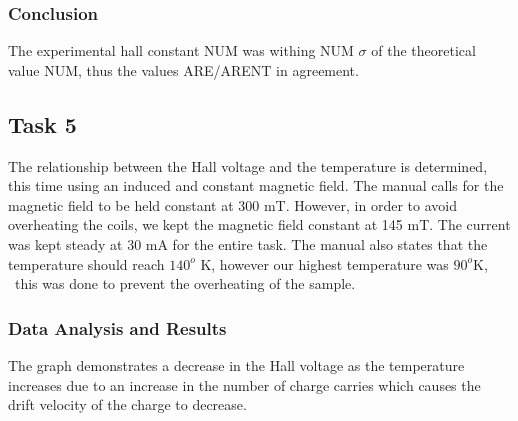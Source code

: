 \documentclass[a4paper]{article}
\begin{document}
\begin{figure}[H]
\centering
\label{task24plot}
\end{figure}








\subsubsection{Conclusion}
\qq The experimental hall constant NUM was withing NUM $\sigma$ of the
theoretical value NUM, thus the values ARE/ARENT in agreement.

\subsection{Task 5}

\qq The relationship between the Hall voltage and the temperature is
determined, this time using an induced and constant magnetic
field. The manual calls for the magnetic field to be held constant at
300 mT. However, in order to avoid overheating the coils, we kept the
magnetic field constant at 145 mT. The current was kept steady at 30
mA for the entire task. The manual also states that the temperature
should reach $140^o$ K, however our highest temperature was $90^o$K, \
this was done to prevent the overheating of the sample.


\subsubsection{Data Analysis and Results}
\qq The graph demonstrates a decrease in the Hall voltage as the
temperature increases due to an increase in the number of charge
carries which causes the drift velocity of the charge to decrease.
\end{document}
